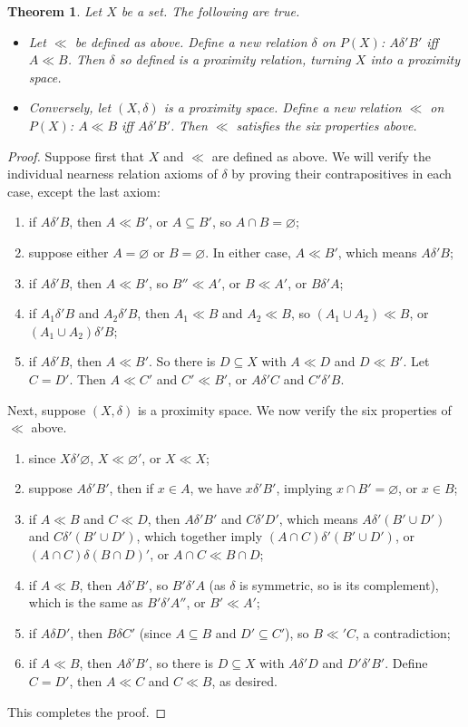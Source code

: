 \documentclass[12pt]{article}
\newtheorem{thm}{Theorem}
\begin{document}
\begin{thm} Let $X$ be a set.  The following are true.
\begin{itemize}  
\item Let $\ll$ be defined as above.  Define a new relation $\delta$ on $P(X)$: $A\delta'B'$ iff $A\ll B$.  Then $\delta$ so defined is a proximity relation, turning $X$ into a proximity space.
\item Conversely, let $(X,\delta)$ is a proximity space.  Define a new relation $\ll$ on $P(X)$: $A\ll B$ iff $A\delta'B'$.  Then $\ll$ satisfies the six properties above.
\end{itemize}
\end{thm}
\begin{proof}
Suppose first that $X$ and $\ll$ are defined as above.  We will verify the individual nearness relation axioms of $\delta$ by proving their contrapositives in each case, except the last axiom:
\begin{enumerate}
\item if $A\delta'B$, then $A\ll B'$, or $A\subseteq B'$, so $A\cap B=\varnothing$;
\item suppose either $A=\varnothing$ or $B=\varnothing$.  In either case, $A\ll B'$, which means $A\delta' B$;
\item if $A\delta' B$, then $A\ll B'$, so $B''\ll A'$, or $B\ll A'$, or $B\delta' A$;
\item if $A_1\delta' B$ and $A_2\delta' B$, then $A_1\ll B$ and $A_2\ll B$, so $(A_1\cup A_2)\ll B$, or $(A_1\cup A_2)\delta' B$;
\item if $A\delta' B$, then $A\ll B'$.  So there is $D\subseteq X$ with $A\ll D$ and $D\ll B'$.  Let $C=D'$.  Then $A\ll C'$ and $C'\ll B'$, or $A\delta' C$ and $C'\delta' B$.
\end{enumerate}

Next, suppose $(X,\delta)$ is a proximity space.  We now verify the six properties of $\ll$ above.
\begin{enumerate}
\item since $X\delta' \varnothing$, $X\ll \varnothing'$, or $X\ll X$; 
\item suppose $A\delta' B'$, then if $x\in A$, we have $x\delta'B'$, implying $x\cap B'=\varnothing$, or $x\in B$;
\item if $A\ll B$ and $C\ll D$, then $A\delta' B'$ and $C\delta' D'$, which means $A\delta' (B'\cup D')$ and $C\delta' (B'\cup D')$, which together imply $(A\cap C)\delta' (B'\cup D')$, or $(A\cap C)\delta (B\cap D)'$, or $A\cap C\ll B\cap D$;
\item if $A\ll B$, then $A\delta' B'$, so $B'\delta' A$ (as $\delta$ is symmetric, so is its complement), which is the same as $B'\delta' A''$, or $B'\ll A'$;
\item if $A\delta D'$, then $B\delta C'$ (since $A\subseteq B$ and $D'\subseteq C'$), so $B\ll' C$, a contradiction;
\item if $A\ll B$, then $A\delta'B'$, so there is $D\subseteq X$ with $A\delta'D$ and $D'\delta'B'$.  Define $C=D'$, then $A\ll C$ and $C\ll B$, as desired.
\end{enumerate}
This completes the proof.
\end{proof}
\end{document}
